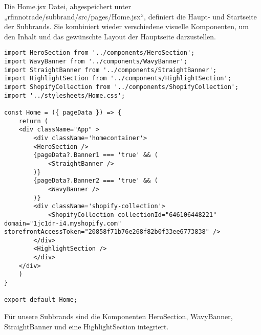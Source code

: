 Die Home.jsx Datei, abgespeichert unter „rfinnotrade/subbrand/src/pages/Home.jsx“, definiert die Haupt- und Startseite der Subbrands. Sie kombiniert wieder verschiedene visuelle Komponenten, um den Inhalt und das gewünschte Layout der Hauptseite darzustellen.

\begin{lstlisting}[language=React, caption={Home.jsx}, label={lst:homejsx}]
import HeroSection from '../components/HeroSection';
import WavyBanner from '../components/WavyBanner';
import StraightBanner from '../components/StraightBanner';
import HighlightSection from '../components/HighlightSection';
import ShopifyCollection from '../components/ShopifyCollection';
import '../stylesheets/Home.css';

const Home = ({ pageData }) => {  
    return (
    <div className="App" >
        <div className='homecontainer'>
        <HeroSection />
        {pageData?.Banner1 === 'true' && (
            <StraightBanner />
        )}
        {pageData?.Banner2 === 'true' && (
            <WavyBanner />
        )}
        <div className='shopify-collection'> 
            <ShopifyCollection collectionId="646106448221" domain="1jc1dr-i4.myshopify.com" storefrontAccessToken="20858f71b76e268f82b0f33ee6773838" />
        </div>
        <HighlightSection />
        </div>
    </div>  
    )
}

export default Home;
\end{lstlisting}

Für unsere Subbrands sind die Komponenten HeroSection, WavyBanner, StraightBanner und eine HighlightSection integriert.